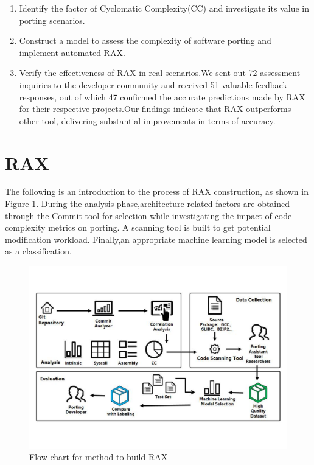 \documentclass[sigconf,screen,review,anonymous]{acmart}
\begin{document}
\begin{enumerate}
  \item Identify the factor of Cyclomatic Complexity(CC) and investigate its value in porting scenarios.
  \item Construct a model to assess the complexity of software porting and implement automated RAX.
  \item Verify the effectiveness of RAX in real scenarios.We sent out 72 assessment inquiries to the developer community and received 51 valuable feedback responses, out of which 47 confirmed the accurate predictions made by RAX for their respective projects.Our findings indicate that RAX outperforms other tool, delivering substantial improvements in terms of accuracy.
\end{enumerate}


\section{RAX}
The following is an introduction to the process of RAX construction, as shown in Figure \ref{fig:figure1}.
During the analysis phase,architecture-related factors are obtained through the Commit tool for selection while investigating the impact of code complexity metrics on porting.
A scanning tool is built to get potential modification workload.
Finally,an appropriate machine learning model is selected as a classification.
\begin{figure}
  \centering
  \includegraphics[width=\linewidth]{figure1.pdf}
  \caption{Flow chart for method to build RAX}
  \label{fig:figure1}
\end{figure}
\end{document}
